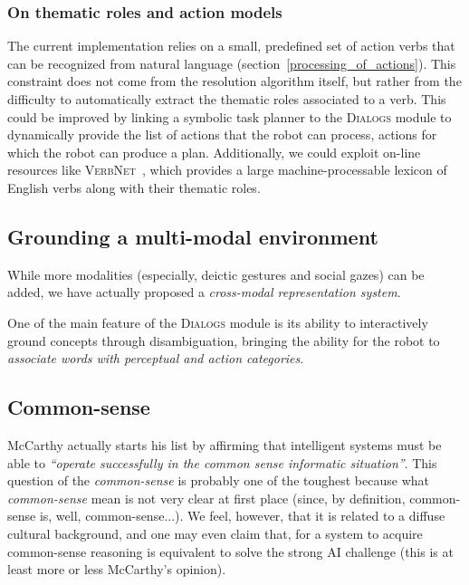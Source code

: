 \subsubsection{On thematic roles and action models}

The current implementation relies on a small, predefined set of action verbs
that can be recognized from natural language
(section~\ref{processing_of_actions}).  This constraint does not come from the
resolution algorithm itself, but rather from the difficulty to automatically
extract the thematic roles associated to a verb.  This could be improved by
linking a symbolic task planner to the \textsc{Dialogs} module to dynamically
provide the list of actions that the robot can process, \ie actions for which
the robot can produce a plan. Additionally, we could exploit on-line resources
like \textsc{VerbNet}~\cite{Kipper2008}, which provides a large
machine-processable lexicon of English verbs along with their thematic roles.


\subsection{Grounding a multi-modal environment}

While more modalities (especially, deictic gestures and social gazes) can be
added, we have actually proposed a \emph{cross-modal representation system}.

One of the main feature of the \textsc{Dialogs} module is its ability to
interactively ground concepts through disambiguation, bringing the ability for
the robot to \emph{associate words with perceptual and action categories}.


\subsection{Common-sense}

McCarthy actually starts his list by affirming that intelligent systems must be
able to \emph{``operate successfully in the common sense informatic
situation''}. This question of the \emph{common-sense} is probably one of the
toughest because what \emph{common-sense} mean is not very clear at first place
(since, by definition, common-sense is, well, common-sense...). We feel,
however, that it is related to a diffuse cultural background, and one may even
claim that, for a system to acquire common-sense reasoning is equivalent to
solve the strong AI challenge (this is at least more or less McCarthy's opinion).


